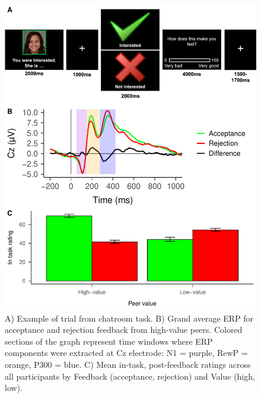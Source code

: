 \documentclass[
  man,floatsintext]{apa7}
\begin{document}
\begin{figure}
\centering
\includegraphics{BUDS_tables_and_figures_working_files/figure-latex/unnamed-chunk-6-1.pdf}
\caption{\label{fig:unnamed-chunk-6}A) Example of trial from chatroom task. B) Grand average ERP for acceptance and rejection feedback from high-value peers. Colored sections of the graph represent time windows where ERP components were extracted at Cz electrode: N1 = purple, RewP = orange, P300 = blue. C) Mean in-task, post-feedback ratings across all participants by Feedback (acceptance, rejection) and Value (high, low).}
\end{figure}
\end{document}
